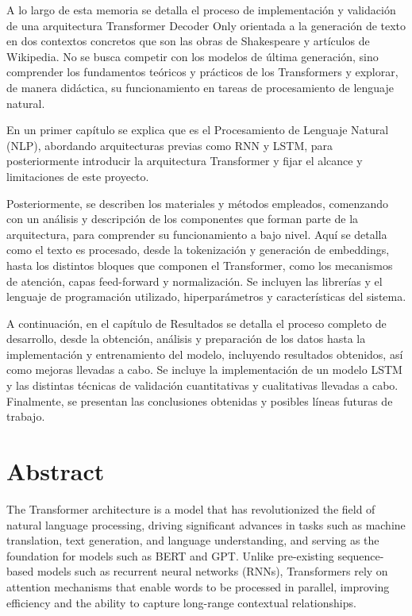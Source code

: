 \documentclass[11pt]{book}
\begin{document}
A lo largo de esta memoria se detalla el proceso de implementación y validación de una arquitectura Transformer Decoder Only orientada a la generación de texto en dos contextos concretos que son las obras de Shakespeare y artículos de Wikipedia. No se busca competir con los modelos de última generación, sino comprender los fundamentos teóricos y prácticos de los Transformers y explorar, de manera didáctica, su funcionamiento en tareas de procesamiento de lenguaje natural.

En un primer capítulo se explica que es el Procesamiento de Lenguaje Natural (NLP), abordando arquitecturas previas como RNN y LSTM, para posteriormente introducir la arquitectura Transformer y fijar el alcance y limitaciones de este proyecto.

Posteriormente, se describen los materiales y métodos empleados, comenzando con un análisis y descripción de los componentes que forman parte de la arquitectura, para comprender su funcionamiento a bajo nivel. Aquí se detalla como el texto es procesado, desde la tokenización y generación de embeddings, hasta los distintos bloques que componen el Transformer, como los mecanismos de atención, capas feed-forward y normalización. Se incluyen las librerías y el lenguaje de programación utilizado, hiperparámetros y características del sistema.

A continuación, en el capítulo de Resultados se detalla el proceso completo de desarrollo, desde la obtención, análisis y preparación de los datos hasta la implementación y entrenamiento del modelo, incluyendo resultados obtenidos, así como mejoras llevadas a cabo. Se incluye la implementación de un modelo LSTM y las distintas técnicas de validación cuantitativas y cualitativas llevadas a cabo. Finalmente, se presentan las conclusiones obtenidas y posibles líneas futuras de trabajo.


\chapter{Abstract}
The Transformer architecture is a model that has revolutionized the field of natural language processing, driving significant advances in tasks such as machine translation, text generation, and language understanding, and serving as the foundation for models such as BERT and GPT. Unlike pre-existing sequence-based models such as recurrent neural networks (RNNs), Transformers rely on attention mechanisms that enable words to be processed in parallel, improving efficiency and the ability to capture long-range contextual relationships.
\end{document}
